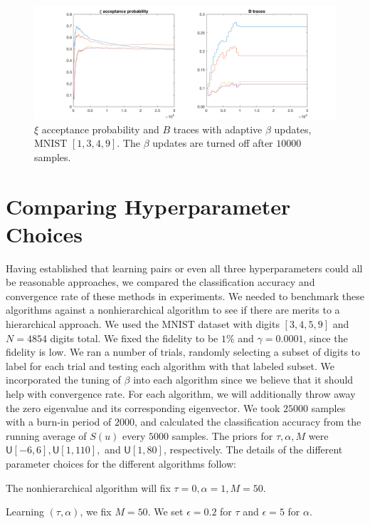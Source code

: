 \documentclass{siamart1116}
\begin{document}
    \begin{figure}[!htb]
        \centering
        \caption{\label{adaptive_mnist_2}$\xi$ acceptance probability and $B$ traces with adaptive $\beta$ updates, MNIST $[1,3, 4, 9]$. The $\beta$ updates are turned off after $10000$ samples.}
        \includegraphics[width=0.8\linewidth]{adaptive_B/with/xi_B.png}
    \end{figure}

\section{Comparing Hyperparameter Choices}
    Having established that learning pairs or even all three hyperparameters could all be reasonable approaches, we compared the classification accuracy and convergence rate of these methods in experiments. We needed to benchmark these algorithms against a nonhierarchical algorithm to see if there are merits to a hierarchical approach. We used the MNIST dataset with digits $[3,4,5,9]$ and $N=4854$ digits total. We fixed the fidelity to be $1\%$ and $\gamma = 0.0001$, since the fidelity is low. We ran a number of trials, randomly selecting a subset of digits to label for each trial and testing each algorithm with that labeled subset. We incorporated the tuning of $\beta$ into each algorithm since we believe that it should help with convergence rate. For each algorithm, we will additionally throw away the zero eigenvalue and its corresponding eigenvector. We took $25000$ samples with a burn-in period of $2000$, and calculated the classification accuracy from the running average of $S(u)$ every $5000$ samples. The priors for $\tau, \alpha, M$ were $\mathsf{U}[-6, 6], \mathsf{U}[1, 110],$ and $\mathsf{U}[1, 80]$, respectively. The details of the different parameter choices for the different algorithms follow:
    
    The nonhierarchical algorithm will fix $\tau=0, \alpha=1, M=50$.

    Learning $(\tau, \alpha)$, we fix $M=50$. We set $\epsilon=0.2$ for $\tau$ and $\epsilon = 5$ for $\alpha$.
\end{document}
